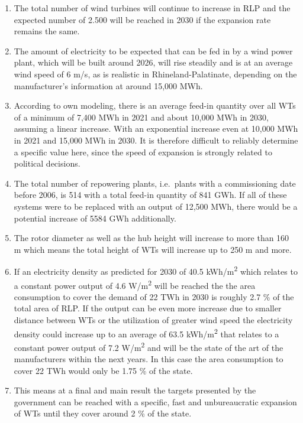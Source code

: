 \documentclass[a4paper,11pt]{article}
\begin{document}
\begin{enumerate}
\def\labelenumi{\arabic{enumi}.}
\item
  The total number of wind turbines will continue to increase in RLP and the expected number of 2.500 will be reached in 2030 if the expansion rate remains the same.
\item
  The amount of electricity to be expected that can be fed in by a wind power plant, which will be built around 2026, will rise steadily and is at an average wind speed of 6 m/s, as is realistic in Rhineland-Palatinate, depending on the manufacturer's information at around 15,000 MWh.
\item
  According to own modeling, there is an average feed-in quantity over all WTs of a minimum of 7,400 MWh in 2021 and about 10,000 MWh in 2030, assuming a linear increase. With an exponential increase even at 10,000 MWh in 2021 and 15,000 MWh in 2030. It is therefore difficult to reliably determine a specific value here, since the speed of expansion is strongly related to political decisions.
\item
  The total number of repowering plants, i.e.~plants with a commissioning date before 2006, is 514 with a total feed-in quantity of 841 GWh. If all of these systems were to be replaced with an output of 12,500 MWh, there would be a potential increase of 5584 GWh additionally.
\item
  The rotor diameter as well as the hub height will increase to more than 160 m which means the total height of WTs will increase up to 250 m and more.
\item
  If an electricity density as predicted for 2030 of 40.5 kWh/m\textsuperscript{2} which relates to a constant power output of 4.6 W/m\textsuperscript{2} will be reached the the area consumption to cover the demand of 22 TWh in 2030 is roughly 2.7 \% of the total area of RLP. If the output can be even more increase due to smaller distance between WTs or the utilization of greater wind speed the electricity density could increase up to an average of 63.5 kWh/m\textsuperscript{2} that relates to a constant power output of 7.2 W/m\textsuperscript{2} and will be the state of the art of the manufacturers within the next years. In this case the area consumption to cover 22 TWh would only be 1.75 \% of the state.
\item
  This means at a final and main result the targets presented by the government can be reached with a specific, fast and unbureaucratic expansion of WTs until they cover around 2 \% of the state.
\end{enumerate}
\end{document}
